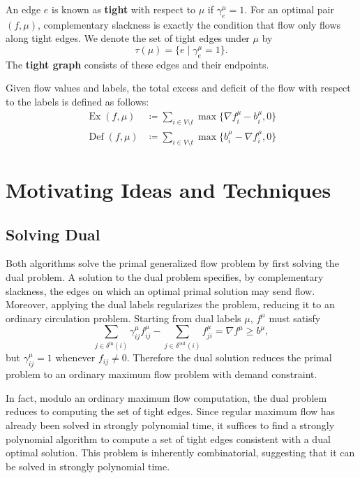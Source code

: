 \documentclass[11pt]{article}
\theoremstyle{definition}
\theoremstyle{definition}
\newcommand{\fu}{f^{\mu}}
\newcommand{\nfiu}{\nabla \fu_i}
\newcommand{\biu}{b_{i}^{\mu}}
\newcommand{\geu}{\gamma_e^{\mu}}
\newcommand{\giij}{\gamma_{ij}^{\mu}}
\newcommand{\din}{\delta^{\text{in}}}
\newcommand{\dout}{\delta^{\text{out}}}
\DeclareMathOperator{\Ex}{Ex}
\DeclareMathOperator{\Def}{Def}
\begin{document}
	An edge $e$ is known as \textbf{tight} with respect to $\mu$ if $\gamma_e^\mu =1$.
	For an optimal pair $(f, \mu)$, complementary slackness is exactly the condition that
	flow only flows along tight edges. We denote the set of tight edges under
	$\mu$ by
    \[ \tau(\mu) = \{e \mid \geu = 1\}. \]
    The \textbf{tight graph} consists of these edges and their endpoints.
	
	Given flow values and labels, the total excess and deficit of the flow with respect
	to the labels is defined as follows:
	\begin{align*}
	\Ex(f,\mu)  &\coloneqq \sum_{i \in V \setminus t} \max \{ \nfiu - \biu, 0 \} \\
	\Def(f,\mu) &\coloneqq \sum_{i \in V \setminus t} \max \{ \biu - \nfiu, 0 \}
	\end{align*}
  
\section{Motivating Ideas and Techniques}
\label{sec:motivate}
	\subsection{Solving Dual}
            
	Both algorithms solve the primal generalized flow problem by first solving the dual problem.
    A solution to the dual problem specifies, by complementary slackness, the edges on which an optimal
    primal solution may send flow. Moreover, applying the dual labels regularizes the problem, reducing
    it to an ordinary circulation problem. Starting from dual labels $\mu$, $f^{\mu}$ must satisfy
    \[ \sum_{j \in \din(i)} \giij \fu_{ij} - \sum_{j \in \dout(i)} \fu_{ji}
     = \nabla f^{\mu} \geq b^{\mu}, \]
    but $\giij = 1$ whenever $f_{ij} \neq 0$. Therefore the dual solution reduces the primal problem
    to an ordinary maximum flow problem with demand constraint.
    
    In fact, modulo an ordinary maximum flow computation, the dual problem reduces to computing
    the set of tight edges. Since regular maximum
    flow has already been solved in strongly polynomial time, it suffices to find a strongly polynomial
    algorithm to compute a set of tight edges consistent with a dual optimal solution. This problem
    is inherently combinatorial, suggesting that it can be solved in strongly polynomial time.
    
\end{document}
